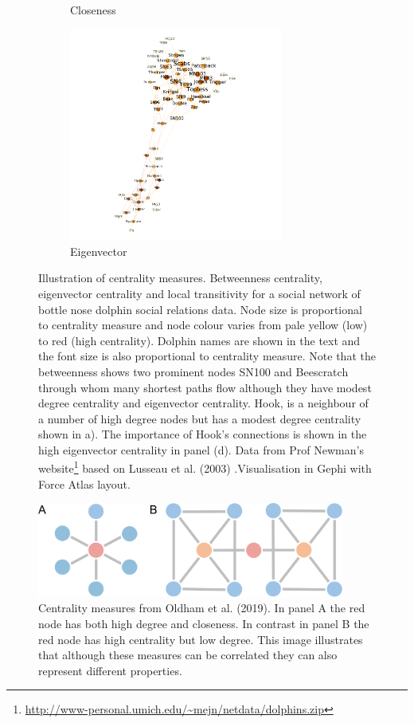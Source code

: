 \begin{figure}
\begin{subfigure}{7cm}
    \caption{Closeness}
  \end{subfigure}
  \begin{subfigure}{7cm}
    \centering\includegraphics[width=7cm]{images/chapter3/dolphin/eig.png}
    \caption{Eigenvector}
  \end{subfigure}
  \caption[\textbf{Illustration of centrality measures} in a dolphin social network.]{\small Illustration of centrality measures. Betweenness centrality, eigenvector centrality and local transitivity for a social network of bottle nose dolphin social relations data. Node size is proportional to centrality measure and node colour varies from pale yellow (low) to red (high centrality). Dolphin names are shown in the text and the font size is also proportional to centrality measure. Note that the betweenness shows two prominent nodes SN100 and Beescratch through whom many shortest paths flow although they have modest degree centrality and eigenvector centrality. Hook, is a neighbour of a number of high degree nodes but has a modest degree centrality shown in a). The importance of Hook's connections is shown in the high eigenvector centrality in panel (d). Data from Prof Newman's website\footnote{\url{http://www-personal.umich.edu/~mejn/netdata/dolphins.zip}} based on Lusseau et al. (2003) \cite{lusseau2003bottlenose}.Visualisation in Gephi with Force Atlas layout. }
  \label{fig:dolphin_multipanel}
\end{figure}
\begin{figure}
    \centering
    \includegraphics[width=0.9\textwidth]{images/chapter3/centality_plos/journalpone0220061g001.PNG}
    \caption{Centrality measures from Oldham et al. (2019)\cite{oldham2019consistency}. In panel A the red node has both high degree and closeness. In contrast in panel B the red node has high centrality but low degree. This image illustrates that although these measures can be correlated they can also represent different properties.}
    \label{fig:centrality measures from Plos}
\end{figure}


